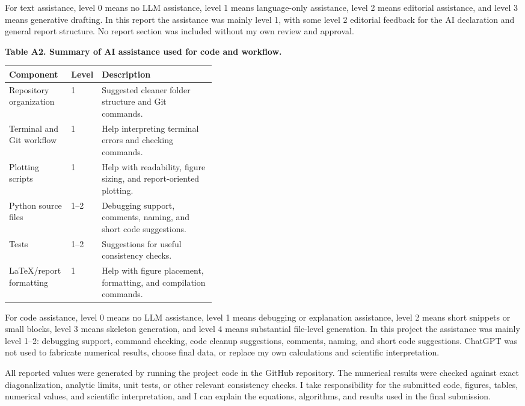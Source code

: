 For text assistance, level 0 means no LLM assistance, level 1 means language-only assistance, level 2 means editorial assistance, and level 3 means generative drafting. In this report the assistance was mainly level 1, with some level 2 editorial feedback for the AI declaration and general report structure. No report section was included without my own review and approval.

\noindent\textbf{Table A2. Summary of AI assistance used for code and workflow.}

\begin{center}
\setlength{\tabcolsep}{3pt}
\renewcommand{\arraystretch}{1.12}
\begin{tabularx}{\linewidth}{@{}p{0.30\linewidth}p{0.10\linewidth}X@{}}
\hline
\textbf{Component} & \textbf{Level} & \textbf{Description} \\
\hline
Repository organization & 1 & Suggested cleaner folder structure and Git commands. \\
Terminal and Git workflow & 1 & Help interpreting terminal errors and checking commands. \\
Plotting scripts & 1 & Help with readability, figure sizing, and report-oriented plotting. \\
Python source files & 1--2 & Debugging support, comments, naming, and short code suggestions. \\
Tests & 1--2 & Suggestions for useful consistency checks. \\
\LaTeX{}/report formatting & 1 & Help with figure placement, formatting, and compilation commands. \\
\hline
\end{tabularx}
\end{center}

For code assistance, level 0 means no LLM assistance, level 1 means debugging or explanation assistance, level 2 means short snippets or small blocks, level 3 means skeleton generation, and level 4 means substantial file-level generation. In this project the assistance was mainly level 1--2: debugging support, command checking, code cleanup suggestions, comments, naming, and short code suggestions. ChatGPT was not used to fabricate numerical results, choose final data, or replace my own calculations and scientific interpretation.

All reported values were generated by running the project code in the GitHub repository. The numerical results were checked against exact diagonalization, analytic limits, unit tests, or other relevant consistency checks. I take responsibility for the submitted code, figures, tables, numerical values, and scientific interpretation, and I can explain the equations, algorithms, and results used in the final submission.
